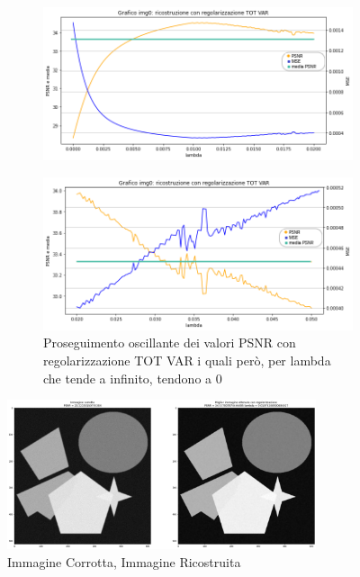 \begin{figure}[H]
    \centering
    \begin{subfigure}{0.8\textwidth}
    \includegraphics[width=\textwidth]{IMMAGINI_RELAZIONE/grafico2TOTVAR_riserva.png}
    \end{subfigure}
    \begin{subfigure}{0.8\textwidth}
        \includegraphics[width=\textwidth]{IMMAGINI_RELAZIONE/proseguimentoGraficoTOTVAR2.png}
        \caption{Proseguimento oscillante dei valori PSNR con regolarizzazione TOT VAR i quali però, per lambda che tende a infinito, tendono a 0}
    \end{subfigure}
    \includegraphics[width=0.81\textwidth]{IMMAGINI_RELAZIONE/ricostruzione2TOTVAR.png}
    \caption{Immagine Corrotta, Immagine Ricostruita}
\end{figure}
